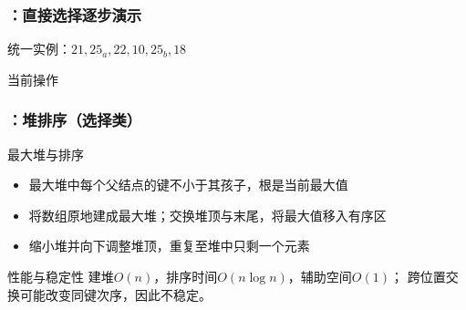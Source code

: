 \begin{frame}
    \frametitle{\insertsectionhead：直接选择逐步演示}
    \begin{exampleblock}{统一实例：$21,25_a,22,10,25_b,18$}
        \centering
    \end{exampleblock}
    \begin{block}{当前操作}
    \end{block}
\end{frame}

\begin{frame}
    \frametitle{\insertsectionhead：堆排序（选择类）}
    \begin{block}{最大堆与排序}
        \begin{itemize}
            \item 最大堆中每个父结点的键不小于其孩子，根是当前最大值
            \item 将数组原地建成最大堆；交换堆顶与末尾，将最大值移入有序区
            \item 缩小堆并向下调整堆顶，重复至堆中只剩一个元素
        \end{itemize}
    \end{block}
    \begin{alertblock}{性能与稳定性}
        建堆$O(n)$，排序时间$O(n\log n)$，辅助空间$O(1)$；
        跨位置交换可能改变同键次序，因此不稳定。
    \end{alertblock}
\end{frame}

